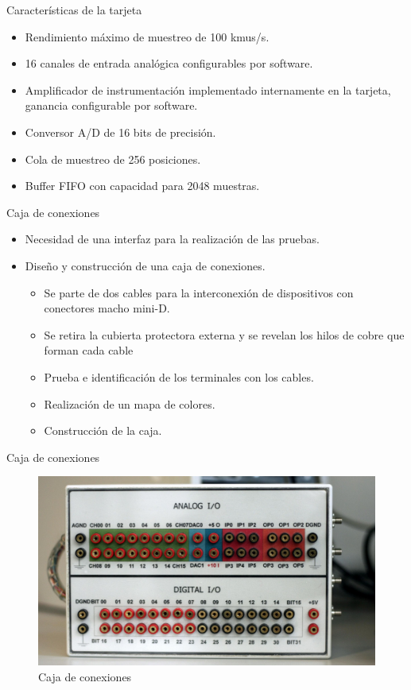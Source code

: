 \documentclass[utf8, compress]			{beamer}
\begin{document}
\begin{frame}{Características de la tarjeta}
    \begin{itemize}
	\item Rendimiento máximo de muestreo de 100 kmus/s.
	\item 16 canales de entrada analógica configurables por software.
	\item Amplificador de instrumentación implementado internamente en
	    la tarjeta, ganancia configurable por software.
	\item Conversor A/D de 16 bits de precisión.
	\item Cola de muestreo de 256 posiciones.
	\item Buffer FIFO con capacidad para 2048 muestras.
    \end{itemize}
\end{frame}

\begin{frame}{Caja de conexiones}
    \begin{itemize}
	\item Necesidad de una interfaz para la realización de las pruebas.
	\item Diseño y construcción de una caja de conexiones.
	    \begin{itemize}
		\item Se parte de dos cables para la interconexión de
		    dispositivos con conectores macho mini-D.
		\item Se retira la cubierta protectora externa y se revelan
		    los hilos de cobre que forman cada cable
		\item Prueba e identificación de los terminales con los
		    cables.
		\item Realización de un mapa de colores.
		\item Construcción de la caja.
	    \end{itemize}
    \end{itemize}
\end{frame}

\begin{frame}{Caja de conexiones}
    \begin{figure}
	\begin{center}
	    \includegraphics{caja.jpg}
	\end{center}
	\caption{Caja de conexiones}
	\label{fig:box}
    \end{figure}
\end{frame}
\end{document}

